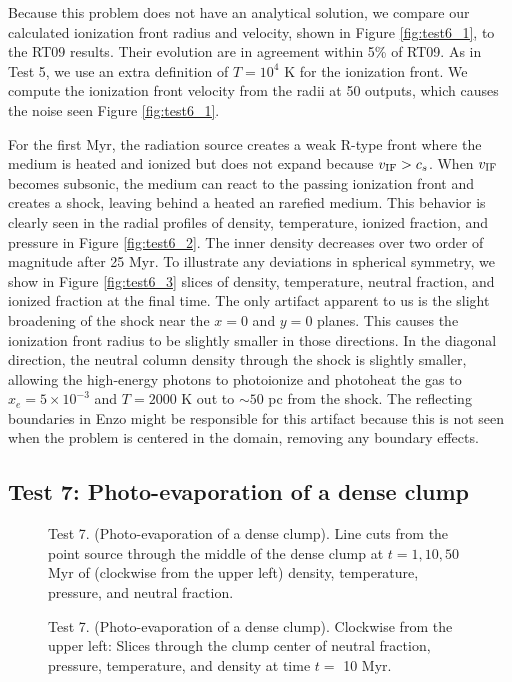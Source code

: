 \documentclass[12pt,preprint]{aastex}
\begin{document}
Because this problem does not have an analytical solution, we compare
our calculated ionization front radius and velocity, shown in Figure
\ref{fig:test6_1}, to the RT09 results.  Their evolution are in
agreement within 5\% of RT09.  As in Test 5, we use an extra
definition of $T=10^4$ K for the ionization front.  We compute the
ionization front velocity from the radii at 50 outputs, which causes
the noise seen Figure \ref{fig:test6_1}.

For the first Myr, the radiation source creates a weak R-type front
where the medium is heated and ionized but does not expand because
$v_{\rm IF} > c_s$.  When $v_{\rm IF}$ becomes subsonic, the medium
can react to the passing ionization front and creates a shock, leaving
behind a heated an rarefied medium.  This behavior is clearly seen in
the radial profiles of density, temperature, ionized fraction, and
pressure in Figure \ref{fig:test6_2}.  The inner density decreases
over two order of magnitude after 25 Myr.  To illustrate any
deviations in spherical symmetry, we show in Figure \ref{fig:test6_3}
slices of density, temperature, neutral fraction, and ionized fraction
at the final time.  The only artifact apparent to us is the slight
broadening of the shock near the $x=0$ and $y=0$ planes.  This causes
the ionization front radius to be slightly smaller in those
directions.  In the diagonal direction, the neutral column density
through the shock is slightly smaller, allowing the high-energy
photons to photoionize and photoheat the gas to $x_e = 5 \times
10^{-3}$ and $T = 2000$ K out to $\sim50$ pc from the shock.  The
reflecting boundaries in Enzo might be responsible for this artifact
because this is not seen when the problem is centered in the domain,
removing any boundary effects.

\subsection{Test 7: Photo-evaporation of a dense clump}

\begin{figure}[t]
  \caption{\label{fig:test7_1} Test 7. (Photo-evaporation of a dense
    clump).  Line cuts from the point source through the middle of the
    dense clump at $t = 1, 10, 50$ Myr of (clockwise from the upper
    left) density, temperature, pressure, and neutral fraction.}
\end{figure}

\begin{figure}[t]
  \caption{\label{fig:test7_2} Test 7. (Photo-evaporation of a dense
    clump).  Clockwise from the upper left: Slices through the clump
    center of neutral fraction, pressure, temperature, and density at
    time $t =$ 10 Myr.}
\end{figure}
\end{document}
